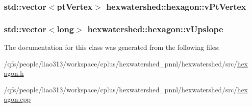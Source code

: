 \hypertarget{classhexwatershed_1_1hexagon_ab68cf5357b69868ffdb4ff9dec64f441}{
\subsubsection[{v\-Pt\-Vertex}]{\setlength{\rightskip}{0pt plus 5cm}std\-::vector$<${\bf pt\-Vertex}$>$ hexwatershed\-::hexagon\-::v\-Pt\-Vertex}}\label{classhexwatershed_1_1hexagon_ab68cf5357b69868ffdb4ff9dec64f441}
\hypertarget{classhexwatershed_1_1hexagon_a71e1777d004ed62b1680a84d39b42287}{
\subsubsection[{v\-Upslope}]{\setlength{\rightskip}{0pt plus 5cm}std\-::vector$<$long$>$ hexwatershed\-::hexagon\-::v\-Upslope}}\label{classhexwatershed_1_1hexagon_a71e1777d004ed62b1680a84d39b42287}


The documentation for this class was generated from the following files\-:\begin{DoxyCompactItemize}
\item 
/qfs/people/liao313/workspace/cplus/hexwatershed\-\_\-pnnl/hexwatershed/src/\hyperlink{hexagon_8h}{hexagon.\-h}\item 
/qfs/people/liao313/workspace/cplus/hexwatershed\-\_\-pnnl/hexwatershed/src/\hyperlink{hexagon_8cpp}{hexagon.\-cpp}\end{DoxyCompactItemize}

